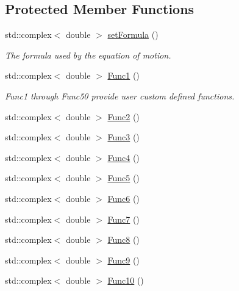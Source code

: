 \subsection*{Protected Member Functions}
\begin{DoxyCompactItemize}
\item 
std\-::complex$<$ double $>$ \hyperlink{classosea_1_1ofreq_1_1_eqn_rotation_a910975e9e2e8d438853a4e7d658850a8}{set\-Formula} ()
\begin{DoxyCompactList}\small\item\em The formula used by the equation of motion. \end{DoxyCompactList}\item 
std\-::complex$<$ double $>$ \hyperlink{classosea_1_1ofreq_1_1_eqn_rotation_aac7de76e4a8da885b4c06f9e694afff1}{Func1} ()
\begin{DoxyCompactList}\small\item\em Func1 through Func50 provide user custom defined functions. \end{DoxyCompactList}\item 
std\-::complex$<$ double $>$ \hyperlink{classosea_1_1ofreq_1_1_eqn_rotation_a6287a211f6758d536848dab92d18e081}{Func2} ()
\item 
std\-::complex$<$ double $>$ \hyperlink{classosea_1_1ofreq_1_1_eqn_rotation_abfad91e6b9cffc60a6e85ea6a46ff64d}{Func3} ()
\item 
std\-::complex$<$ double $>$ \hyperlink{classosea_1_1ofreq_1_1_eqn_rotation_a93e98c20eda7e3f040c4ac354ec82a74}{Func4} ()
\item 
std\-::complex$<$ double $>$ \hyperlink{classosea_1_1ofreq_1_1_eqn_rotation_a67b54733dbeed8cc6ec5a18ebc4115f8}{Func5} ()
\item 
std\-::complex$<$ double $>$ \hyperlink{classosea_1_1ofreq_1_1_eqn_rotation_acb3797b3ec3fb5d2fdccfe6ee800e470}{Func6} ()
\item 
std\-::complex$<$ double $>$ \hyperlink{classosea_1_1ofreq_1_1_eqn_rotation_a39df2d7a20142545d67b95bc73c7f477}{Func7} ()
\item 
std\-::complex$<$ double $>$ \hyperlink{classosea_1_1ofreq_1_1_eqn_rotation_aa4983c923f72cec31dd00d3bdf81a1c9}{Func8} ()
\item 
std\-::complex$<$ double $>$ \hyperlink{classosea_1_1ofreq_1_1_eqn_rotation_a47de6dace20f98dbfe8559f8e4acb19e}{Func9} ()
\item 
std\-::complex$<$ double $>$ \hyperlink{classosea_1_1ofreq_1_1_eqn_rotation_afa4e9d5dc8a1ca68e9e081207a68a985}{Func10} ()
\item 

\end{DoxyCompactItemize}
